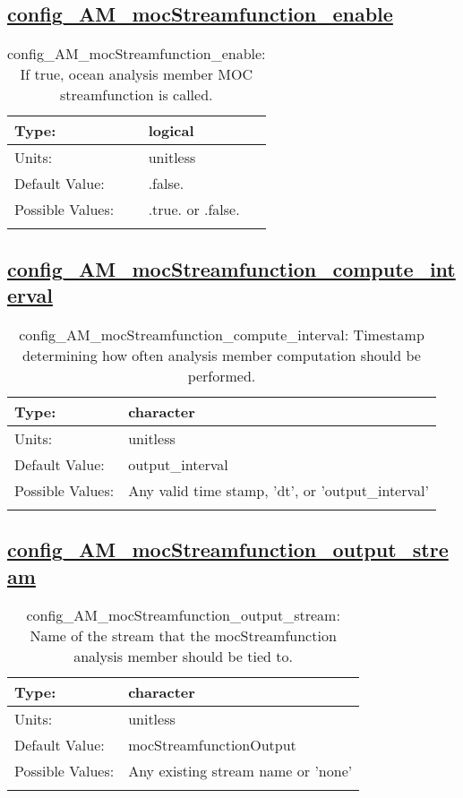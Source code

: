 \subsection[config\_AM\_mocStreamfunction\_enable]{\hyperref[sec:nm_tab_AM_mocStreamfunction]{config\_AM\_mocStreamfunction\_enable}}
\label{subsec:nm_sec_config_AM_mocStreamfunction_enable}
\begin{center}
\begin{longtable}{| p{2.0in} || p{4.0in} |}
    \hline
    Type: & logical \\
    \hline
    Units: & \si{unitless} \\
    \hline
    Default Value: & .false. \\
    \hline
    Possible Values: & .true. or .false. \\
    \hline
    \caption{config\_AM\_mocStreamfunction\_enable: If true, ocean analysis member MOC streamfunction is called.}
\end{longtable}
\end{center}
\subsection[config\_AM\_mocStreamfunction\_compute\_interval]{\hyperref[sec:nm_tab_AM_mocStreamfunction]{config\_AM\_mocStreamfunction\_compute\_interval}}
\label{subsec:nm_sec_config_AM_mocStreamfunction_compute_interval}
\begin{center}
\begin{longtable}{| p{2.0in} || p{4.0in} |}
    \hline
    Type: & character \\
    \hline
    Units: & \si{unitless} \\
    \hline
    Default Value: & output\_interval \\
    \hline
    Possible Values: & Any valid time stamp, 'dt', or 'output\_interval' \\
    \hline
    \caption{config\_AM\_mocStreamfunction\_compute\_interval: Timestamp determining how often analysis member computation should be performed.}
\end{longtable}
\end{center}
\subsection[config\_AM\_mocStreamfunction\_output\_stream]{\hyperref[sec:nm_tab_AM_mocStreamfunction]{config\_AM\_mocStreamfunction\_output\_stream}}
\label{subsec:nm_sec_config_AM_mocStreamfunction_output_stream}
\begin{center}
\begin{longtable}{| p{2.0in} || p{4.0in} |}
    \hline
    Type: & character \\
    \hline
    Units: & \si{unitless} \\
    \hline
    Default Value: & mocStreamfunctionOutput \\
    \hline
    Possible Values: & Any existing stream name or 'none' \\
    \hline
    \caption{config\_AM\_mocStreamfunction\_output\_stream: Name of the stream that the mocStreamfunction analysis member should be tied to.}
\end{longtable}
\end{center}
